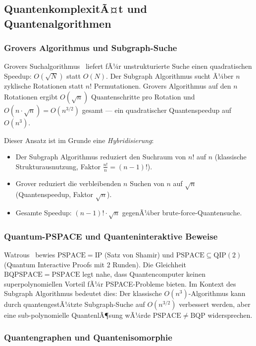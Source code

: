 ﻿\documentclass[a4paper,12pt]{article}
\theoremstyle{definition}
\begin{document}
\subsection{QuantenkomplexitÃ¤t und Quantenalgorithmen}

\subsubsection{Grovers Algorithmus und Subgraph-Suche}

Grovers Suchalgorithmus~\cite{grover1996fast} liefert fÃ¼r unstrukturierte Suche
einen quadratischen Speedup: $O(\sqrt{N})$ statt $O(N)$.
Der Subgraph Algorithmus sucht Ã¼ber $n$ zyklische Rotationen statt $n!$ Permutationen.
Grovers Algorithmus auf den $n$ Rotationen ergibt $O(\sqrt{n})$ Quantenschritte
pro Rotation und $O(n \cdot \sqrt{n}) = O(n^{3/2})$ gesamt --- ein quadratischer
Quantenspeedup auf $O(n^3)$.

Dieser Ansatz ist im Grunde eine \emph{Hybridisierung}:
\begin{itemize}
  \item Der Subgraph Algorithmus reduziert den Suchraum von $n!$ auf $n$
        (klassische Strukturausnutzung, Faktor $\frac{n!}{n} = (n-1)!$).
  \item Grover reduziert die verbleibenden $n$ Suchen von $n$ auf $\sqrt{n}$
        (Quantenspeedup, Faktor $\sqrt{n}$).
  \item Gesamte Speedup: $(n-1)! \cdot \sqrt{n}$ gegenÃ¼ber brute-force-Quantensuche.
\end{itemize}

\subsubsection{Quantum-PSPACE und Quanteninteraktive Beweise}

Watrous~\cite{watrous2003pspace} bewies $\mathrm{PSPACE} = \mathrm{IP}$
(Satz von Shamir) und $\mathrm{PSPACE} \subseteq \mathrm{QIP}(2)$
(Quantum Interactive Proofs mit 2 Runden).
Die Gleichheit $\mathrm{BQPSPACE} = \mathrm{PSPACE}$ legt nahe,
dass Quantencomputer keinen superpolynomiellen Vorteil fÃ¼r PSPACE-Probleme
bieten. Im Kontext des Subgraph Algorithmus bedeutet dies:
Der klassische $O(n^3)$-Algorithmus kann durch quantengestÃ¼tzte Subgraph-Suche
auf $O(n^{3/2})$ verbessert werden, aber eine sub-polynomielle QuantenlÃ¶sung
wÃ¼rde $\mathrm{PSPACE} \neq \mathrm{BQP}$ widersprechen.

\subsubsection{Quantengraphen und Quantenisomorphie}
\end{document}
